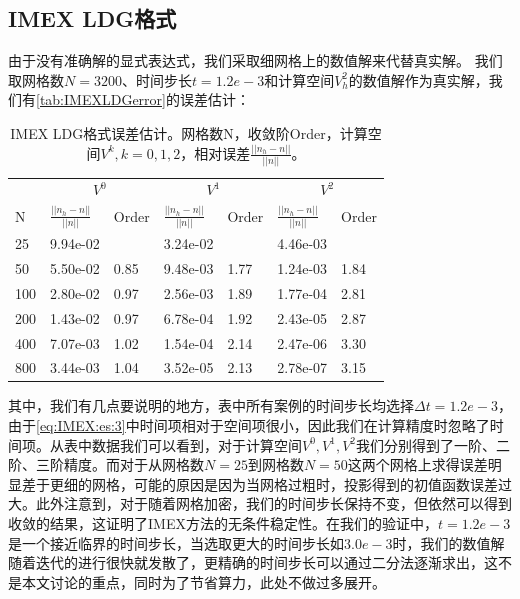 \subsection{IMEX LDG格式}
由于没有准确解的显式表达式，我们采取细网格上的数值解来代替真实解。
我们取网格数$N=3200$、时间步长$t=1.2e-3$和计算空间$V_h^2$的数值解作为真实解，我们有\autoref{tab:IMEXLDGerror}的误差估计：
\begin{table}
    \begin{tabularx}{\textwidth}{@{} *7{X} @{}}
        \toprule
            & \multicolumn{2}{c}{$V^0$} & \multicolumn{2}{c}{$V^1$} & \multicolumn{2}{c}{$V^2$}                                                     \\
        \cmidrule(lr){2-3} \cmidrule(lr){4-5} \cmidrule(lr){6-7}
        N   & $\frac{||n_h-n||}{||n||}$ & Order                     & $\frac{||n_h-n||}{||n||}$ & Order     & $\frac{||n_h-n||}{||n||}$ & Order     \\

        \midrule
        25  & 9.94e-02                  & \text{——}                 & 3.24e-02                  & \text{——} & 4.46e-03                  & \text{——} \\
        50  & 5.50e-02                  & 0.85                      & 9.48e-03                  & 1.77      & 1.24e-03                  & 1.84      \\
        100 & 2.80e-02                  & 0.97                      & 2.56e-03                  & 1.89      & 1.77e-04                  & 2.81      \\
        200 & 1.43e-02                  & 0.97                      & 6.78e-04                  & 1.92      & 2.43e-05                  & 2.87      \\
        400 & 7.07e-03                  & 1.02                      & 1.54e-04                  & 2.14      & 2.47e-06                  & 3.30      \\
        800 & 3.44e-03                  & 1.04                      & 3.52e-05                  & 2.13      & 2.78e-07                  & 3.15      \\
        \bottomrule
    \end{tabularx}
    \caption{IMEX LDG格式误差估计。网格数N，收敛阶Order，计算空间$V^k, k=0,1,2$，相对误差$\frac{||n_h-n||}{||n||}$。}
    \label{tab:IMEXLDGerror}
\end{table}

其中，我们有几点要说明的地方，表中所有案例的时间步长均选择$\Delta t = 1.2e-3$，由于\eqref{eq:IMEX:es:3}中时间项相对于空间项很小，因此我们在计算精度时忽略了时间项。从表中数据我们可以看到，对于计算空间$V^0, V^1, V^2$我们分别得到了一阶、二阶、三阶精度。而对于从网格数$N=25$到网格数$N=50$这两个网格上求得误差明显差于更细的网格，可能的原因是因为当网格过粗时，投影得到的初值函数误差过大。此外注意到，对于随着网格加密，我们的时间步长保持不变，但依然可以得到收敛的结果，这证明了IMEX方法的无条件稳定性。在我们的验证中，$t=1.2e-3$是一个接近临界的时间步长，当选取更大的时间步长如$3.0e-3$时，我们的数值解随着迭代的进行很快就发散了，更精确的时间步长可以通过二分法逐渐求出，这不是本文讨论的重点，同时为了节省算力，此处不做过多展开。

